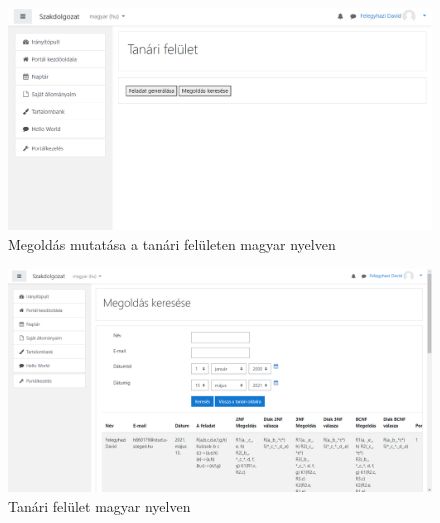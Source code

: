 \begin{figure}
    \centering
    \includegraphics[scale=0.4]{Fejezetek/Images/magyar04.png}
    \caption{Megoldás mutatása a tanári felületen magyar nyelven}
\end{figure}
\begin{figure}
    \centering
    \includegraphics[scale=0.4]{Fejezetek/Images/magyar05.png}
    \caption{Tanári felület magyar nyelven}
\end{figure}


